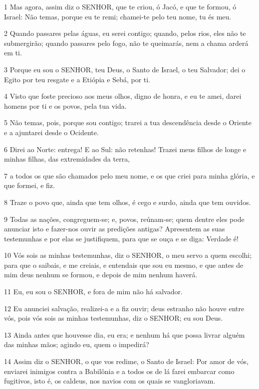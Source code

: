 \par 1 Mas agora, assim diz o SENHOR, que te criou, ó Jacó, e que te formou, ó Israel: Não temas, porque eu te remi; chamei-te pelo teu nome, tu és meu.
\par 2 Quando passares pelas águas, eu serei contigo; quando, pelos rios, eles não te submergirão; quando passares pelo fogo, não te queimarás, nem a chama arderá em ti.
\par 3 Porque eu sou o SENHOR, teu Deus, o Santo de Israel, o teu Salvador; dei o Egito por teu resgate e a Etiópia e Sebá, por ti.
\par 4 Visto que foste precioso aos meus olhos, digno de honra, e eu te amei, darei homens por ti e os povos, pela tua vida.
\par 5 Não temas, pois, porque sou contigo; trarei a tua descendência desde o Oriente e a ajuntarei desde o Ocidente.
\par 6 Direi ao Norte: entrega! E ao Sul: não retenhas! Trazei meus filhos de longe e minhas filhas, das extremidades da terra,
\par 7 a todos os que são chamados pelo meu nome, e os que criei para minha glória, e que formei, e fiz.
\par 8 Traze o povo que, ainda que tem olhos, é cego e surdo, ainda que tem ouvidos.
\par 9 Todas as nações, congreguem-se; e, povos, reúnam-se; quem dentre eles pode anunciar isto e fazer-nos ouvir as predições antigas? Apresentem as suas testemunhas e por elas se justifiquem, para que se ouça e se diga: Verdade é!
\par 10 Vós sois as minhas testemunhas, diz o SENHOR, o meu servo a quem escolhi; para que o saibais, e me creiais, e entendais que sou eu mesmo, e que antes de mim deus nenhum se formou, e depois de mim nenhum haverá.
\par 11 Eu, eu sou o SENHOR, e fora de mim não há salvador.
\par 12 Eu anunciei salvação, realizei-a e a fiz ouvir; deus estranho não houve entre vós, pois vós sois as minhas testemunhas, diz o SENHOR; eu sou Deus.
\par 13 Ainda antes que houvesse dia, eu era; e nenhum há que possa livrar alguém das minhas mãos; agindo eu, quem o impedirá?
\par 14 Assim diz o SENHOR, o que vos redime, o Santo de Israel: Por amor de vós, enviarei inimigos contra a Babilônia e a todos os de lá farei embarcar como fugitivos, isto é, os caldeus, nos navios com os quais se vangloriavam.
